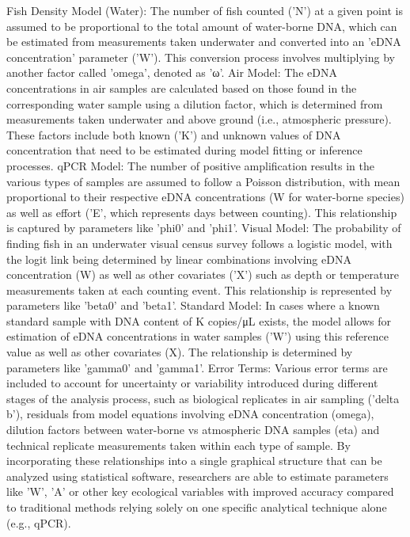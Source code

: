 \documentclass{article}
\begin{document}
Fish Density Model (Water): The number of fish counted ('N') at a given point is assumed to be proportional to the total amount of water-borne DNA, which can be estimated from measurements taken underwater and converted into an 'eDNA concentration' parameter ('W'). This conversion process involves multiplying by another factor called 'omega', denoted as 'ω'.
Air Model: The eDNA concentrations in air samples are calculated based on those found in the corresponding water sample using a dilution factor, which is determined from measurements taken underwater and above ground (i.e., atmospheric pressure). These factors include both known ('K') and unknown values of DNA concentration that need to be estimated during model fitting or inference processes.
qPCR Model: The number of positive amplification results in the various types of samples are assumed to follow a Poisson distribution, with mean proportional to their respective eDNA concentrations (W for water-borne species) as well as effort ('E', which represents days between counting). This relationship is captured by parameters like 'phi0' and 'phi1'.
Visual Model: The probability of finding fish in an underwater visual census survey follows a logistic model, with the logit link being determined by linear combinations involving eDNA concentration (W) as well as other covariates ('X') such as depth or temperature measurements taken at each counting event. This relationship is represented by parameters like 'beta0' and 'beta1'.
Standard Model: In cases where a known standard sample with DNA content of K copies/μL exists, the model allows for estimation of eDNA concentrations in water samples ('W') using this reference value as well as other covariates (X). The relationship is determined by parameters like 'gamma0' and 'gamma1'.
Error Terms: Various error terms are included to account for uncertainty or variability introduced during different stages of the analysis process, such as biological replicates in air sampling ('delta b'), residuals from model equations involving eDNA concentration (omega), dilution factors between water-borne vs atmospheric DNA samples (eta) and technical replicate measurements taken within each type of sample. By incorporating these relationships into a single graphical structure that can be analyzed using statistical software, researchers are able to estimate parameters like 'W', 'A' or other key ecological variables with improved accuracy compared to traditional methods relying solely on one specific analytical technique alone (e.g., qPCR).
\end{document}
